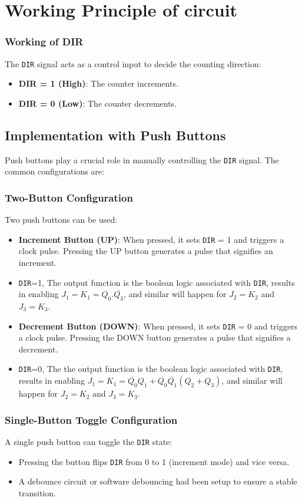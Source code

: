 \documentclass[a4paper,12pt]{article}
\begin{document}
\section{Working Principle of circuit}

\subsubsection{Working of DIR}
The \texttt{DIR} signal acts as a control input to decide the counting direction:
\begin{itemize}
    \item \textbf{DIR = 1 (High)}: The counter increments.
    \item \textbf{DIR = 0 (Low)}: The counter decrements.
\end{itemize}

\subsection{Implementation with Push Buttons}
Push buttons play a crucial role in manually controlling the \texttt{DIR} signal. The common configurations are:
\subsubsection{Two-Button Configuration}
Two push buttons can be used:
\begin{itemize}
    \item \textbf{Increment Button (UP)}: When pressed, it sets \texttt{DIR} = 1 and triggers a clock pulse. Pressing the UP button generates a pulse that signifies an increment.
    \item \texttt{DIR}=1, The output function is the boolean logic associated with \texttt{DIR}, results in enabling $J_1=K_1=Q_0.\overline{Q_3}$, and similar will happen for $J_2=K_2$ and $J_3=K_3$.
    \item \textbf{Decrement Button (DOWN)}: When pressed, it sets \texttt{DIR} = 0 and triggers a clock pulse. Pressing the DOWN button generates a pulse that signifies a decrement.
    \item \texttt{DIR}=0, The the output function is the boolean logic associated with \texttt{DIR}, results in enabling $J_1=K_1=\overline{Q_0}Q_1+\overline{Q_0}\overline{Q_1}(Q_2+Q_3)$, and similar will happen for $J_2=K_2$ and $J_3=K_3$.
\end{itemize}

\subsubsection{Single-Button Toggle Configuration}
A single push button can toggle the \texttt{DIR} state:
\begin{itemize}
    \item Pressing the button flips \texttt{DIR} from 0 to 1 (increment mode) and vice versa.
    \item A debounce circuit or software debouncing had been setup to ensure a stable transition.
\end{itemize}
\end{document}
